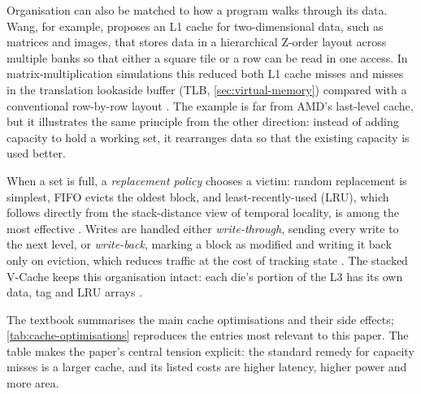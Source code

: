 Organisation can also be matched to how a program walks through its data. Wang, for example, proposes an L1 cache for two-dimensional data, such as matrices and images, that stores data in a hierarchical Z-order layout across multiple banks so that either a square tile or a row can be read in one access. In matrix-multiplication simulations this reduced both L1 cache misses and misses in the translation lookaside buffer (TLB, \cref{sec:virtual-memory}) compared with a conventional row-by-row layout \cite{wangDesignImplementationCache2019}. The example is far from AMD's last-level cache, but it illustrates the same principle from the other direction: instead of adding capacity to hold a working set, it rearranges data so that the existing capacity is used better.

When a set is full, a \emph{replacement policy} chooses a victim: random replacement is simplest, FIFO evicts the oldest block, and least-recently-used (LRU), which follows directly from the stack-distance view of temporal locality, is among the most effective \cite[sec.~11.2.5]{sarangi2025basic}. Writes are handled either \emph{write-through}, sending every write to the next level, or \emph{write-back}, marking a block as modified and writing it back only on eviction, which reduces traffic at the cost of tracking state \cite[sec.~11.2.3]{sarangi2025basic}. The stacked V-Cache keeps this organisation intact: each die's portion of the L3 has its own data, tag and LRU arrays \cite[slide~20]{wuu2022vcache}.

The textbook summarises the main cache optimisations and their side effects; \cref{tab:cache-optimisations} reproduces the entries most relevant to this paper. The table makes the paper's central tension explicit: the standard remedy for capacity misses is a larger cache, and its listed costs are higher latency, higher power and more area.

